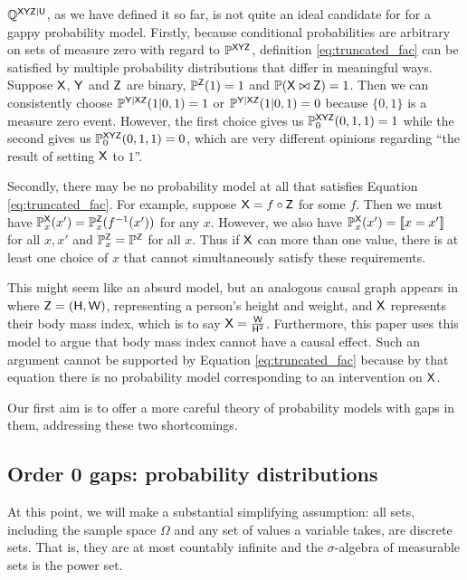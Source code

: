 $\mathbb{Q}^{\mathsf{XYZ}|\mathsf{U}}$, as we have defined it so far, is not quite an ideal candidate for for a gappy probability model. Firstly, because conditional probabilities are arbitrary on sets of measure zero with regard to $\mathbb{P}^{\mathsf{XYZ}}$, definition \ref{eq:truncated_fac} can be satisfied by multiple probability distributions that differ in meaningful ways. Suppose $\mathsf{X}$, $\mathsf{Y}$ and $\mathsf{Z}$ are binary, $\mathbb{P}^{\mathsf{Z}}(1)=1$ and $\mathbb{P}(\mathsf{X}\bowtie \mathsf{Z})=1$. Then we can consistently choose $\mathbb{P}^{\mathsf{Y|XZ}}(1|0,1)=1$ or $\mathbb{P}^{\mathsf{Y|XZ}}(1|0,1)=0$ because $\{0,1\}$ is a measure zero event. However, the first choice gives us  $\mathbb{P}^{\mathsf{XYZ}}_{0}(0,1,1)=1$ while the second gives us $\mathbb{P}^{\mathsf{XYZ}}_{0}(0,1,1)=0$, which are very different opinions regarding ``the result of setting $\mathsf{X}$ to $1$''.

Secondly, there may be no probability model at all that satisfies Equation \ref{eq:truncated_fac}. For example, suppose $\mathsf{X}=f\circ\mathsf{Z}$ for some $f$. Then we must have $\mathbb{P}^{\mathsf{X}}_x(x')=\mathbb{P}^{\mathsf{Z}}_x(f^{-1}(x'))$ for any $x$. However, we also have $\mathbb{P}^{\mathsf{X}}_x(x')=\llbracket x = x' \rrbracket$ for all $x,x'$ and $\mathbb{P}^{\mathsf{Z}}_x=\mathbb{P}^{\mathsf{Z}}$ for all $x$. Thus if $\mathsf{X}$ can more than one value, there is at least one choice of $x$ that cannot simultaneously satisfy these requirements.

This might seem like an absurd model, but an analogous causal graph appears in \citet{shahar_association_2009} where $\mathsf{Z}=(\mathsf{H},\mathsf{W})$, representing a person's height and weight, and $\mathsf{X}$ represents their body mass index, which is to say $\mathsf{X}=\frac{\mathsf{W}}{\mathsf{H}^2}$. Furthermore, this paper uses this model to argue that body mass index cannot have a causal effect. Such an argument cannot be supported by Equation \ref{eq:truncated_fac} because by that equation there is no probability model corresponding to an intervention on $\mathsf{X}$.

Our first aim is to offer a more careful theory of probability models with gaps in them, addressing these two shortcomings.

\subsection{Order 0 gaps: probability distributions}

At this point, we will make a substantial simplifying assumption: all sets, including the sample space $\Omega$ and any set of values a variable takes, are discrete sets. That is, they are at most countably infinite and the $\sigma$-algebra of measurable sets is the power set.

